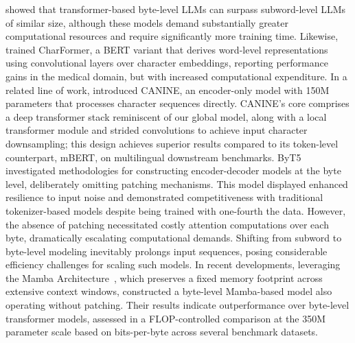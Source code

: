 \cite{Choe2019BridgingTG} showed that transformer-based byte-level LLMs can surpass subword-level LLMs of similar size, although these models demand substantially greater computational resources and require significantly more training time. Likewise, \cite{el2020characterbert} trained CharFormer, a BERT variant that derives word-level representations using convolutional layers over character embeddings, reporting performance gains in the medical domain, but with increased computational expenditure. In a related line of work, \cite{clark2022canine} introduced CANINE, an encoder-only model with 150M parameters that processes character sequences directly. CANINE's core comprises a deep transformer stack reminiscent of our global model, along with a local transformer module and strided convolutions to achieve input character downsampling; this design achieves superior results compared to its token-level counterpart, mBERT, on multilingual downstream benchmarks. ByT5~\citep{xue2022byt5} investigated methodologies for constructing encoder-decoder models at the byte level, deliberately omitting patching mechanisms. This model displayed enhanced resilience to input noise and demonstrated competitiveness with traditional tokenizer-based models despite being trained with one-fourth the data. However, the absence of patching necessitated costly attention computations over each byte, dramatically escalating computational demands. Shifting from subword to byte-level modeling inevitably prolongs input sequences, posing considerable efficiency challenges for scaling such models. In recent developments, leveraging the Mamba Architecture~\citep{gu2023mamba}, which preserves a fixed memory footprint across extensive context windows, \cite{wang2024mambabyte} constructed a byte-level Mamba-based model also operating without patching. Their results indicate outperformance over byte-level transformer models, assessed in a FLOP-controlled comparison at the 350M parameter scale based on bits-per-byte across several benchmark datasets.

